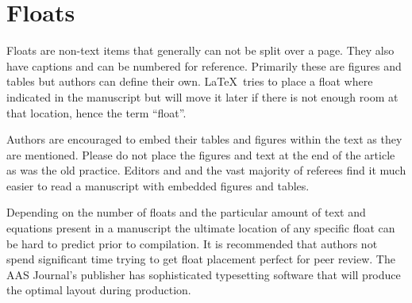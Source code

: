 \documentclass{aastex6}
\newcommand\latex{La\TeX}
\begin{document}
\section{Floats} \label{sec:floats}

Floats are non-text items that generally can not be split over a page.
They also have captions and can be numbered for reference.  Primarily these
are figures and tables but authors can define their own. \latex\ tries to
place a float where indicated in the manuscript but will move it later if
there is not enough room at that location, hence the term ``float''.

Authors are encouraged to embed their tables and figures within the text as
they are mentioned.  Please do not place the figures and text at the end of
the article as was the old practice.  Editors and and the vast majority of
referees find it much easier to read a manuscript with embedded figures and
tables.

Depending on the number of floats and the particular amount of text and
equations present in a manuscript the ultimate location of any specific
float can be hard to predict prior to compilation. It is recommended that
authors not spend significant time trying to get float placement perfect
for peer review.  The AAS Journal's publisher has sophisticated typesetting
software that will produce the optimal layout during production.
\end{document}
